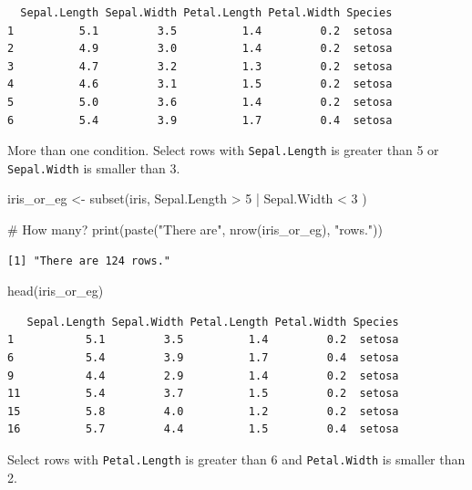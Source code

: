 \documentclass[
  letterpaper,
  DIV=11,
  numbers=noendperiod]{scrreprt}
\newenvironment{Shaded}{\begin{snugshade}}{\end{snugshade}}
\newcommand{\CommentTok}[1]{\textcolor[rgb]{0.37,0.37,0.37}{#1}}
\newcommand{\DecValTok}[1]{\textcolor[rgb]{0.68,0.00,0.00}{#1}}
\newcommand{\FunctionTok}[1]{\textcolor[rgb]{0.28,0.35,0.67}{#1}}
\newcommand{\NormalTok}[1]{\textcolor[rgb]{0.00,0.23,0.31}{#1}}
\newcommand{\OtherTok}[1]{\textcolor[rgb]{0.00,0.23,0.31}{#1}}
\newcommand{\SpecialCharTok}[1]{\textcolor[rgb]{0.37,0.37,0.37}{#1}}
\newcommand{\StringTok}[1]{\textcolor[rgb]{0.13,0.47,0.30}{#1}}
\begin{document}
\begin{verbatim}
  Sepal.Length Sepal.Width Petal.Length Petal.Width Species
1          5.1         3.5          1.4         0.2  setosa
2          4.9         3.0          1.4         0.2  setosa
3          4.7         3.2          1.3         0.2  setosa
4          4.6         3.1          1.5         0.2  setosa
5          5.0         3.6          1.4         0.2  setosa
6          5.4         3.9          1.7         0.4  setosa
\end{verbatim}

More than one condition. Select rows with \texttt{Sepal.Length} is
greater than 5 or \texttt{Sepal.Width} is smaller than 3.

\begin{Shaded}
\begin{Highlighting}[]
\NormalTok{iris\_or\_eg }\OtherTok{\textless{}{-}} \FunctionTok{subset}\NormalTok{(iris, Sepal.Length }\SpecialCharTok{\textgreater{}} \DecValTok{5} \SpecialCharTok{|}\NormalTok{ Sepal.Width }\SpecialCharTok{\textless{}} \DecValTok{3}\NormalTok{ )}

\CommentTok{\# How many?}
\FunctionTok{print}\NormalTok{(}\FunctionTok{paste}\NormalTok{(}\StringTok{"There are"}\NormalTok{, }\FunctionTok{nrow}\NormalTok{(iris\_or\_eg), }\StringTok{"rows."}\NormalTok{))}
\end{Highlighting}
\end{Shaded}

\begin{verbatim}
[1] "There are 124 rows."
\end{verbatim}

\begin{Shaded}
\begin{Highlighting}[]
\FunctionTok{head}\NormalTok{(iris\_or\_eg)}
\end{Highlighting}
\end{Shaded}

\begin{verbatim}
   Sepal.Length Sepal.Width Petal.Length Petal.Width Species
1           5.1         3.5          1.4         0.2  setosa
6           5.4         3.9          1.7         0.4  setosa
9           4.4         2.9          1.4         0.2  setosa
11          5.4         3.7          1.5         0.2  setosa
15          5.8         4.0          1.2         0.2  setosa
16          5.7         4.4          1.5         0.4  setosa
\end{verbatim}

Select rows with \texttt{Petal.Length} is greater than 6 and
\texttt{Petal.Width} is smaller than 2.
\end{document}
